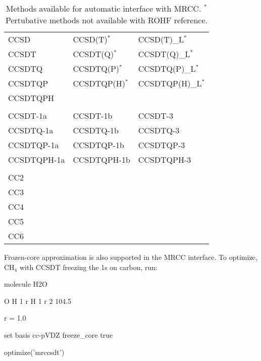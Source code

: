\begin{table}
\caption{Methods available for automatic interface with MRCC. $^*$Pertubative methods not available with ROHF reference.} \label{tab:mrccauto}
\begin{center}
\small
\begin{tabular}{lll} \hline\hline
CCSD        & CCSD(T)$^*$      & CCSD(T)\_L$^*$    \\
CCSDT       & CCSDT(Q)$^*$     & CCSDT(Q)\_L$^*$   \\
CCSDTQ      & CCSDTQ(P)$^*$    & CCSDTQ(P)\_L$^*$  \\
CCSDTQP     & CCSDTQP(H)$^*$   & CCSDTQP(H)\_L$^*$ \\
CCSDTQPH    &                  &                   \\
            &                  &                   \\
CCSDT-1a    & CCSDT-1b         & CCSDT-3           \\
CCSDTQ-1a   & CCSDTQ-1b        & CCSDTQ-3          \\
CCSDTQP-1a  & CCSDTQP-1b       & CCSDTQP-3         \\
CCSDTQPH-1a & CCSDTQPH-1b      & CCSDTQPH-3        \\
            &                  &                   \\
CC2         &                  &                   \\
CC3         &                  &                   \\
CC4         &                  &                   \\
CC5         &                  &                   \\
CC6         &                  &                   \\
\hline\hline
\end{tabular}
\end{center}
\end{table}

Frozen-core approximation is also supported in the MRCC interface. To optimize, CH$_4$ with CCSDT freezing the 1s on carbon, run:

\begin{Snippet}
molecule H2O {
    O
    H 1 r
    H 1 r 2 104.5

    r = 1.0
}

set {
    basis cc-pVDZ
    freeze_core true
}

optimize('mrccsdt')
\end{Snippet}
